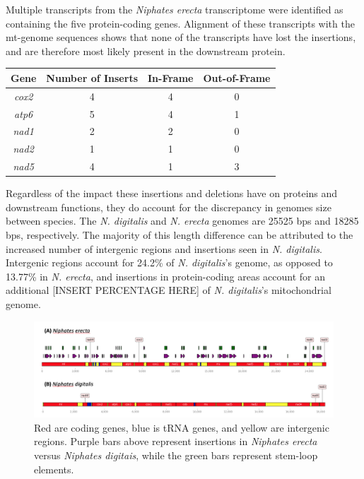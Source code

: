 \documentclass[../main.tex]{subfiles}
\begin{document}
Multiple transcripts from the \emph{Niphates erecta} transcriptome were identified as containing the five protein-coding genes. Alignment of these transcripts with the mt-genome sequences shows that none of the transcripts have lost the insertions, and are therefore most likely present in the downstream protein.

\begin{center}
\begin{tabular}{ |c|c|c|c| } 
 \hline
 \textbf{Gene}& \textbf{Number of Inserts} & \textbf{In-Frame} & \textbf{Out-of-Frame}\\
 \hline
 \emph{cox2}  & 4  & 4 & 0 \\
\hline
\emph{atp6} & 5 & 4 & 1 \\
\hline
\emph{nad1} & 2 & 2 & 0 \\
\hline
\emph{nad2} & 1 & 1 & 0 \\
\hline
\emph{nad5} & 4 & 1 & 3 \\
\hline
\end{tabular}
\end{center}

Regardless of the impact these insertions and deletions have on proteins and downstream functions, they do account for the discrepancy in genomes size between species. The \emph{N. digitalis} and \emph{N. erecta} genomes are 25525 bps and 18285 bps, respectively. The majority of this length difference can be attributed to the increased number of intergenic regions and insertions seen in \emph{N. digitalis}. Intergenic regions account for 24.2\% of \emph{N. digitalis}'s genome, as opposed to 13.77\% in \emph{N. erecta}, and insertions in protein-coding areas account for an additional [INSERT PERCENTAGE HERE] of \emph{N. digitalis}'s mitochondrial genome.

\begin{figure}[htp]
    \centering
    \includegraphics[width=1.0\textwidth]{Figures/figure 5.png}
    \caption{Red are coding genes, blue is tRNA genes, and yellow are intergenic regions. Purple bars above represent insertions in \emph{Niphates erecta} versus \emph{Niphates digitais}, while the green bars represent stem-loop elements.}
\end{figure}
\end{document}
